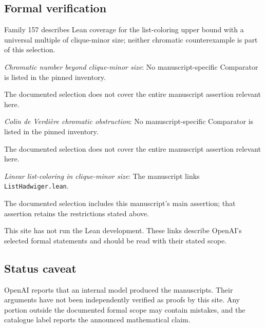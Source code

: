 \documentclass[11pt]{article}
\begin{document}
\subsection{Formal verification}
Family 157 describes Lean coverage for the list-coloring upper bound with a universal multiple of clique-minor size; neither chromatic counterexample is part of this selection.

\textit{Chromatic number beyond clique-minor size}: No manuscript-specific Comparator is listed in the pinned inventory.

The documented selection does not cover the entire manuscript assertion relevant here.

\textit{Colin de Verdière chromatic obstruction}: No manuscript-specific Comparator is listed in the pinned inventory.

The documented selection does not cover the entire manuscript assertion relevant here.

\textit{Linear list-coloring in clique-minor size}: The manuscript links \texttt{ListHadwiger.lean}.

The documented selection includes this manuscript’s main assertion; that assertion retains the restrictions stated above.

This site has not run the Lean development. These links describe OpenAI’s selected formal statements and should be read with their stated scope.

\subsection{Status caveat}
OpenAI reports that an internal model produced the manuscripts. Their arguments have not been independently verified as proofs by this site. Any portion outside the documented formal scope may contain mistakes, and the catalogue label reports the announced mathematical claim.
\end{document}
